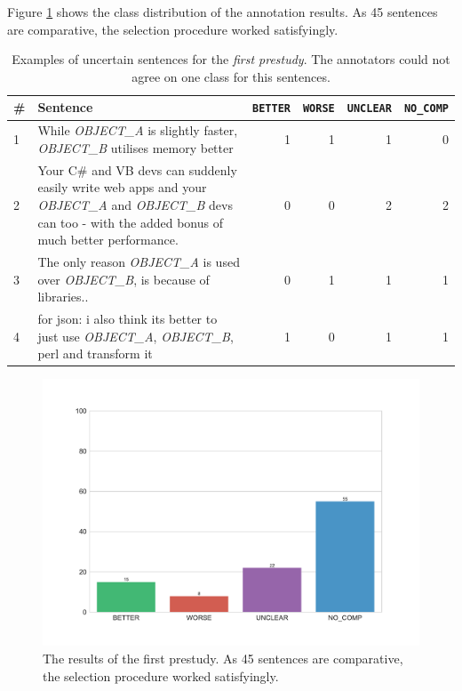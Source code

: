 Figure \ref{fig:dist_pre_a} shows the class distribution of the annotation results. As 45 sentences are comparative, the selection procedure worked satisfyingly.


\begin{table}[htbp]
\centering
\caption{Examples of uncertain sentences for the \emph{first prestudy}. The annotators could not agree on one class for this sentences. }
\label{tbl:pre_1_res}
\begin{tabularx}{\textwidth}{lXrrrr}
\toprule
\# & Sentence        & \texttt{BETTER} & \texttt{WORSE} & \texttt{UNCLEAR} & \texttt{NO\_COMP}          \\ \midrule

1&While \emph{OBJECT\_A} is slightly faster, \emph{OBJECT\_B} utilises memory better & 1 & 1 & 1 & 0 \\

2&Your C\# and VB devs can suddenly easily write web apps and your \emph{OBJECT\_A} and \emph{OBJECT\_B} devs can too - with the added bonus of much better performance. & 0 & 0 & 2 & 2 \\

3&The only reason \emph{OBJECT\_A} is used over \emph{OBJECT\_B}, is because of libraries.. & 0 & 1 & 1 & 1 \\

4&for json: i also think its better to just use \emph{OBJECT\_A}, \emph{OBJECT\_B}, perl and transform it & 1 & 0 & 1 & 1 \\

\bottomrule                              
\end{tabularx}
\end{table}

\begin{figure}[htbp]
\centering
\caption{The results of the first prestudy. As 45  sentences are comparative, the selection procedure worked satisfyingly.}
\label{fig:dist_pre_a}
\includegraphics[width=1\linewidth]{images/dataset/prea-dist}
\end{figure}
\FloatBarrier

